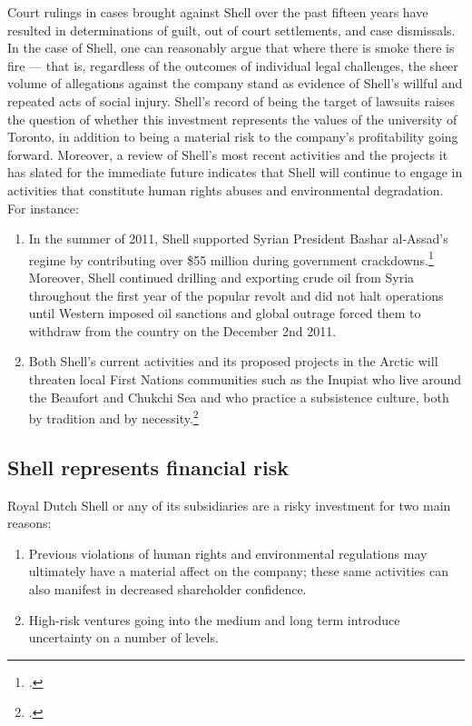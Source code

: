 	
Court rulings in cases brought against Shell over the past fifteen years have resulted in determinations of guilt, out of court settlements, and case dismissals. 
In the case of Shell, one can reasonably argue that where there is smoke there is fire --- that is, regardless of the outcomes of individual legal challenges, the sheer volume of allegations against the company stand as evidence of Shell's willful and repeated acts of social injury.
Shell's record of being the target of lawsuits raises the question of whether this investment represents the values of the university of Toronto, in addition to being a material risk to the company's profitability going forward.
Moreover, a review of Shell's most recent activities and the projects it has slated for the immediate future indicates that Shell will continue to engage in activities that constitute human rights abuses and environmental degradation.
For instance:
\begin{enumerate}
	\item In the summer of 2011, Shell supported Syrian President Bashar al-Assad's regime by contributing over \$55 million during government crackdowns.\footcite[][]{Syria_2011} Moreover, Shell continued drilling and exporting crude oil from Syria throughout the first year of the popular revolt and did not halt operations until Western imposed oil sanctions and global outrage forced them to withdraw from the country on the December 2nd 2011.
	\item Both Shell's current activities and its proposed projects in the Arctic will threaten local First Nations communities such as the Inupiat who live around the Beaufort and Chukchi Sea and who practice a subsistence culture, both by tradition and by necessity.\footcite[][p. 13]{RiskingRuin_2012}
\end{enumerate}



	\subsection{Shell represents financial risk}
	


Royal Dutch Shell or any of its subsidiaries are a risky investment for two main reasons:
\begin{enumerate}
	\item Previous violations of human rights and environmental regulations may ultimately have a material affect on the company; these same activities can also manifest in decreased shareholder confidence.
	\item High-risk ventures going into the medium and long term introduce uncertainty on a number of levels.
\end{enumerate}

